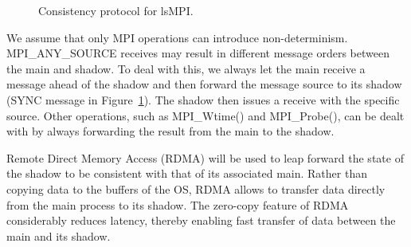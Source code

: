 \begin{figure}[!t]
  \begin{center}
  \end{center}
  \caption{Consistency protocol for lsMPI.}
  \label{fig:cons_protocol}
\end{figure}

We assume that only MPI operations can introduce non-determinism. MPI\_ANY\_SOURCE receives may result in different message orders between the main and shadow. To deal with this, we always let the main receive a message ahead of the shadow and then forward the message source to its shadow (SYNC message in Figure~\ref{fig:cons_protocol}). 
The shadow then issues a receive with the specific source. Other operations, such as MPI\_Wtime() and MPI\_Probe(), can be dealt with by always forwarding the result from the main to the shadow.

Remote Direct Memory Access (RDMA) will be used to leap forward the state of the shadow to be consistent with that of its associated main. Rather than copying data to the buffers of the OS, RDMA allows to transfer data directly from the main process to its shadow. The zero-copy feature of RDMA considerably reduces latency, thereby enabling fast transfer of data between the main and its shadow.
